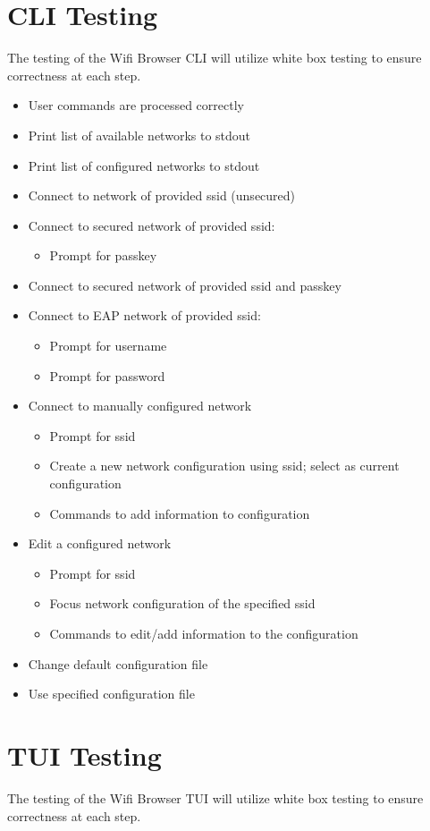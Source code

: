 \documentclass[11pt]{article}
\begin{document}
\section{CLI Testing}
The testing of the Wifi Browser CLI will utilize white box testing to ensure correctness at each step.
\begin{itemize}
  \item User commands are processed correctly
  \item Print list of available networks to stdout
  \item Print list of configured networks to stdout
  \item Connect to network of provided ssid (unsecured)
  \item Connect to secured network of provided ssid:
    \begin{itemize}
      \item Prompt for passkey
    \end{itemize}

  \item Connect to secured network of provided ssid and passkey
  \item Connect to EAP network of provided ssid:
    \begin{itemize}
      \item Prompt for username
      \item Prompt for password
    \end{itemize}

  \item Connect to manually configured network
    \begin{itemize}
      \item Prompt for ssid
      \item Create a new network configuration using ssid; select as current configuration
      \item Commands to add information to configuration
    \end{itemize}

  \item Edit a configured network
    \begin{itemize}
      \item Prompt for ssid
      \item Focus network configuration of the specified ssid
      \item Commands to edit/add information to the configuration
    \end{itemize}
  \item Change default configuration file
  \item Use specified configuration file
\end{itemize}

\section{TUI Testing}
The testing of the Wifi Browser TUI will utilize white box testing to ensure correctness at each step.
\end{document}
